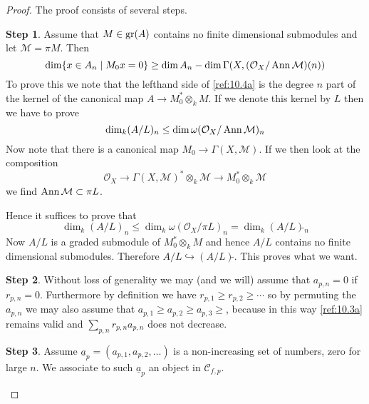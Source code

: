 \documentclass{amsproc}
\def\Cscr{{\mathcal C}}
\def\Mscr{{\mathcal M}}
\def\Oscr{{\mathcal O}}
\def\Ann{\mathop{\text{Ann}}\nolimits}
\def\gr{\mathop{\text{gr}}}
\def\gr{\operatorname {gr}}
\def\gr{\operatorname {gr}}
\def\r{\rightarrow}
\let\oldtext\text
\def\text#1{\oldtext{\upshape #1}}
\theoremstyle{definition}
\newtheorem{step}{Step}
\theoremstyle{remark}
\numberwithin{equation}{section}
\numberwithin{table}{section}
\numberwithin{figure}{section}
\def\gr{\mathop{\text{gr}}}
\begin{document}
\begin{proof}
The proof consists of several steps. 
\setcounter{step}{0}
\begin{step} 
\label{ref:1c}
Assume that $M\in \gr(A)$ contains no finite dimensional submodules and let
  $\Mscr=\pi M$. Then
\begin{equation}
\label{ref:10.4a}
\dim \{x\in A_n\mid M_0 x=0\}\ge \dim A_n-\dim
\Gamma(X,(\Oscr_X/\Ann\Mscr)(n))
\end{equation}
To prove this we note that the lefthand side of \eqref{ref:10.4a} is
the degree $n$ part of the kernel of the canonical map $A\r
M^\ast_0\otimes_k M$. If we denote this kernel by $L$ then we have to
prove
\[
\dim_k (A/L)_n\le \dim \omega(\Oscr_X/\Ann\Mscr)_n
\]
Now note that there is a canonical map $M_0\r \Gamma(X,\Mscr)$. If we
then look at the composition
\[
\Oscr_X\r \Gamma(X,\Mscr)^\ast \otimes_k\Mscr\r M^\ast_0\otimes_k
\Mscr
\]
we find $\Ann\Mscr\subset \pi L$.

Hence it suffices to prove that 
\[
\dim_k(A/L)_n\le \dim_k\omega(\Oscr_X/\pi L)_n=\dim_k (A/L)\tilde{}_n
\]
Now $A/L$ is a graded submodule of $M^\ast_0\otimes_k M$ and hence
$A/L$ contains no finite dimensional submodules. Therefore
$A/L\hookrightarrow (A/L)\tilde{}$. This proves what we want.
\end{step}
\begin{step}
\label{ref:2b}
Without loss of generality we may (and we will) assume that
$a_{p,n}=0$ if $r_{p,n}=0$. Furthermore by definition we have
$r_{p,1}\ge r_{p,2}\ge \cdots$ so by permuting the $a_{p,n}$ we may
also assume that $a_{p,1}\ge a_{p,2}\ge a_{p,3}\ge$, because in this
way \eqref{ref:10.3a} remains valid and $\sum_{p,n} r_{p,n}a_{p,n}$
does not decrease.
\end{step}
\begin{step}
\label{ref:3c}
Assume $\underline{a}_p=(a_{p,1},a_{p,2},\ldots)$ is a non-increasing set of
numbers, zero for large $n$.
We associate to such $\underline{a}_p$ an object in $\Cscr_{f,p}$.


\end{step}
\end{proof}
\end{document}
